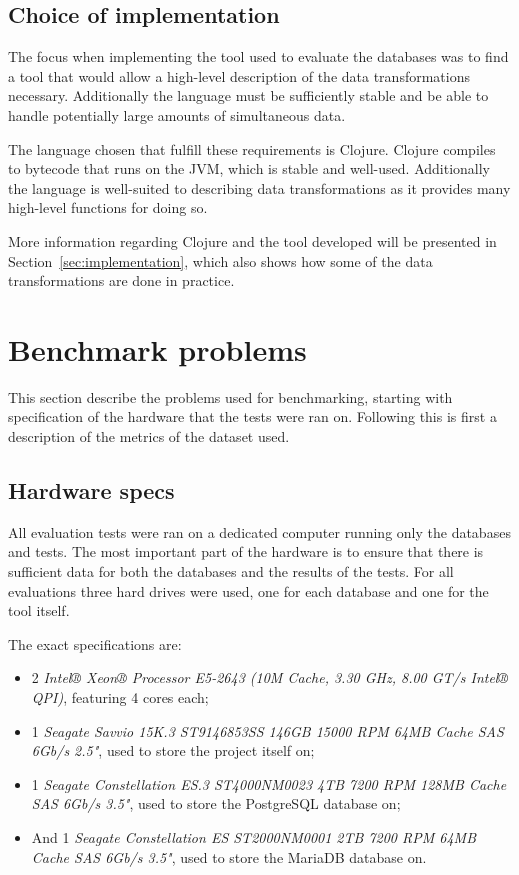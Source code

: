 \subsection{Choice of implementation}
The focus when implementing the tool used to evaluate the databases was to find
a tool that would allow a high-level description of the data transformations
necessary. Additionally the language must be sufficiently stable and be able to
handle potentially large amounts of simultaneous data.

The language chosen that fulfill these requirements is Clojure. Clojure compiles
to bytecode that runs on the JVM, which is stable and well-used. Additionally
the language is well-suited to describing data transformations as it provides
many high-level functions for doing so.

More information regarding Clojure and the tool developed will be presented in
Section~\ref{sec:implementation}, which also shows how some of the data
transformations are done in practice.

\section{Benchmark problems}\label{sec:benchmark}
This section describe the problems used for benchmarking, starting with
specification of the hardware that the tests were ran on. Following this is
first a description of the metrics of the dataset used.

\subsection{Hardware specs}
All evaluation tests were ran on a dedicated computer running only the databases
and tests. The most important part of the hardware is to ensure that there is
sufficient data for both the databases and the results of the tests. For all
evaluations three hard drives were used, one for each database and one for the
tool itself.

The exact specifications are:
\begin{itemize}
\item 2 \textit{Intel® Xeon® Processor E5-2643 (10M Cache, 3.30 GHz, 8.00 GT/s Intel®
    QPI)}, featuring 4 cores each;
\item 1 \textit{Seagate Savvio 15K.3 ST9146853SS 146GB 15000 RPM 64MB Cache SAS 6Gb/s
    2.5"}, used to store the project itself on;
\item 1 \textit{Seagate Constellation ES.3 ST4000NM0023 4TB 7200 RPM 128MB Cache SAS
    6Gb/s 3.5"}, used to store the PostgreSQL database on;
\item And 1 \textit{Seagate Constellation ES ST2000NM0001 2TB 7200 RPM 64MB Cache SAS 6Gb/s
    3.5"}, used to store the MariaDB database on.
\end{itemize}

